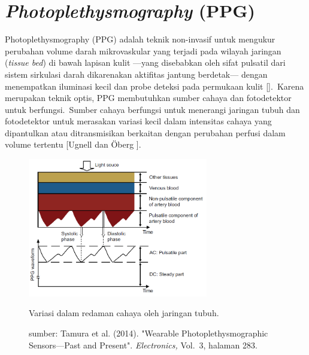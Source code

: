 
\section{\textit{Photoplethysmography} (PPG)}

Photoplethysmography (PPG) adalah teknik non-invasif untuk mengukur perubahan volume darah mikrovaskular yang terjadi pada wilayah jaringan (\textit{tissue bed}) di bawah lapisan kulit ---yang disebabkan oleh sifat pulsatil dari sistem sirkulasi darah dikarenakan aktifitas jantung berdetak--- dengan menempatkan iluminasi kecil dan probe deteksi pada permukaan kulit [\citet{Allen2007,Kamal1989}].~Karena merupakan teknik optis, PPG membutuhkan sumber cahaya dan fotodetektor untuk berfungsi.~Sumber cahaya berfungsi untuk menerangi jaringan tubuh dan fotodetektor untuk merasakan variasi  kecil dalam intensitas cahaya yang dipantulkan atau ditransmisikan berkaitan dengan perubahan perfusi dalam volume tertentu [Ugnell dan Öberg \citep{ugnell1995}]. 

\begin{figure}[ht]
	\vspace{0.3em}
	\centering
	\includegraphics[width=0.7\textwidth]{ppg}
	\caption{Variasi dalam redaman cahaya oleh jaringan tubuh.}
	\caption*{sumber: Tamura et al. (2014). "Wearable Photoplethysmographic Sensors—Past and Present". \textit{Electronics,} Vol.~3, halaman 283.}
	\label{fig:ppg}   
\end{figure}


